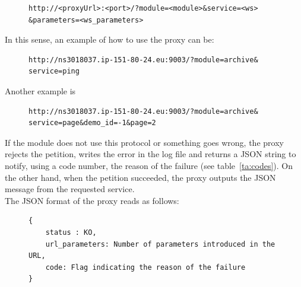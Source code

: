 \begin{figure}[!ht]
\centering
\begin{verbatim}
http://<proxyUrl>:<port>/?module=<module>&service=<ws>
&parameters=<ws_parameters>
\end{verbatim}
\label{fig:url_protocol}
\end{figure}

In this sense, an example of how to use the proxy can be:

\begin{figure}[!ht]
\centering
\begin{verbatim}
http://ns3018037.ip-151-80-24.eu:9003/?module=archive&
service=ping
\end{verbatim}
\label{fig:url_ping_example}
\end{figure}

Another example is 

\begin{figure}[!ht]
\centering
\begin{verbatim}
http://ns3018037.ip-151-80-24.eu:9003/?module=archive&
service=page&demo_id=-1&page=2
\end{verbatim}
\label{fig:url_ping_example}
\end{figure}


If the module does not use this protocol or something goes wrong, the proxy rejects the petition, writes the error in the log file and returns a JSON string to notify, using a code number, the reason of the failure (see table~\ref{ta:codes}). On the other hand, when the petition succeeded, the proxy outputs the JSON message from the requested  service. \\

The JSON format of the proxy reads as follows:
\begin{figure}[!ht]
\centering
\begin{verbatim}
{
    status : KO,
    url_parameters: Number of parameters introduced in the URL,
    code: Flag indicating the reason of the failure
}
\end{verbatim}
\end{figure}


